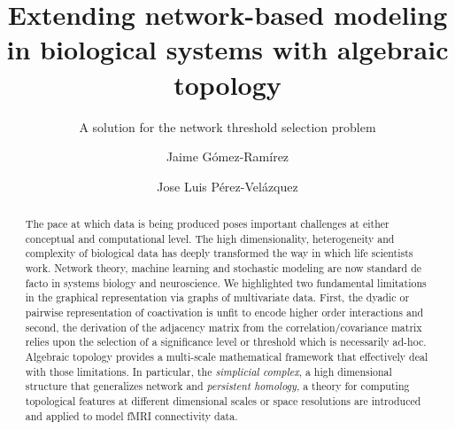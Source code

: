 \documentclass[onecollarge,runningheads]{svjour2}
\begin{document}
\title{Extending network-based modeling in biological systems with algebraic topology
}
\subtitle{A solution for the network threshold selection problem\\ }
\author{Jaime G\'omez-Ram\'irez        \and
        Jose Luis P\'erez-Vel\'azquez %
}
\maketitle

\begin{abstract}
The pace at which data is being produced poses important challenges at either conceptual and computational level. The high dimensionality, heterogeneity and complexity of biological data has deeply transformed the way in which life scientists work. Network theory, machine learning and stochastic modeling are now standard de facto in systems biology and neuroscience.
We highlighted two fundamental limitations in the graphical representation via graphs of multivariate data. First, the dyadic or pairwise representation of coactivation is unfit to encode higher order interactions and second, the derivation of the adjacency matrix from the correlation/covariance matrix relies upon the selection of a significance level or threshold which is necessarily ad-hoc.
Algebraic topology provides a multi-scale mathematical framework that effectively deal with those limitations. In particular, the \emph{simplicial complex}, a high dimensional structure that generalizes network and \emph{persistent homology}, a theory for computing topological features at different dimensional scales or space resolutions are introduced and applied to model fMRI connectivity data.

\end{abstract}
\end{document}
